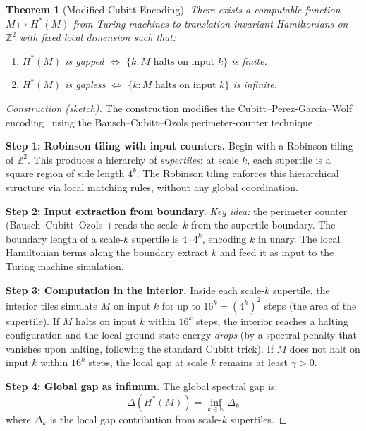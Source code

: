 \documentclass[11pt,a4paper]{article}
\theoremstyle{plain}
\newtheorem{theorem}{Theorem}[section]
\theoremstyle{definition}
\newcommand{\NN}{\mathbb{N}}
\newcommand{\ZZ}{\mathbb{Z}}
\begin{document}
\begin{theorem}[Modified Cubitt Encoding]\label{thm:encoding}
There exists a computable function $M \mapsto H^*(M)$ from Turing
machines to translation-invariant Hamiltonians on $\ZZ^2$ with
fixed local dimension such that:
\begin{enumerate}[nosep,label=(\alph*)]
\item $H^*(M)$ is gapped $\Leftrightarrow$
  $\{k : M \text{ halts on input } k\}$ is finite.
\item $H^*(M)$ is gapless $\Leftrightarrow$
  $\{k : M \text{ halts on input } k\}$ is infinite.
\end{enumerate}
\end{theorem}

\begin{proof}[Construction (sketch)]
The construction modifies the Cubitt--Perez-Garcia--Wolf
encoding~\cite{CPgW2015} using the Bausch--Cubitt--Ozols
perimeter-counter technique~\cite{BCO2018}.

\medskip\noindent
\textbf{Step 1: Robinson tiling with input counters.}
Begin with a Robinson tiling of $\ZZ^2$.
This produces a hierarchy of \emph{supertiles}: at scale $k$,
each supertile is a square region of side length $4^k$.
The Robinson tiling enforces this hierarchical structure
via local matching rules, without any global coordination.

\medskip\noindent
\textbf{Step 2: Input extraction from boundary.}
\emph{Key idea:} the perimeter counter
(Bausch--Cubitt--Ozols~\cite{BCO2018}) reads the scale~$k$
from the supertile boundary.  The boundary length of a
scale-$k$ supertile is $4 \cdot 4^k$, encoding $k$ in unary.
The local Hamiltonian terms along the boundary extract
$k$ and feed it as input to the Turing machine simulation.

\medskip\noindent
\textbf{Step 3: Computation in the interior.}
Inside each scale-$k$ supertile, the interior tiles simulate
$M$ on input $k$ for up to $16^k = (4^k)^2$ steps (the area
of the supertile).  If $M$ halts on input $k$ within $16^k$
steps, the interior reaches a halting configuration and the
local ground-state energy \emph{drops} (by a spectral penalty
that vanishes upon halting, following the standard Cubitt trick).
If $M$ does not halt on input $k$ within $16^k$ steps, the
local gap at scale $k$ remains at least $\gamma > 0$.

\medskip\noindent
\textbf{Step 4: Global gap as infimum.}
The global spectral gap is:
\[
\Delta(H^*(M)) = \inf_{k \in \NN} \Delta_k
\]
where $\Delta_k$ is the local gap contribution from scale-$k$
supertiles.


\end{proof}
\end{document}
